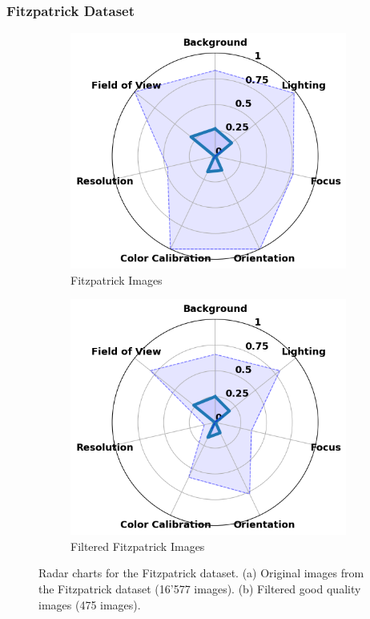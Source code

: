 \subsubsection{Fitzpatrick Dataset}
\label{subsubsec:FitzpatrickDataset}
\begin{figure}[ht]
    \centering
    \begin{subfigure}[b]{0.48\textwidth}
        \includegraphics[width=\textwidth]{img/hept/Fitzpatrick17k.png}
        \caption{Fitzpatrick Images}
        \label{fig:Fitzpatrick17K}
    \end{subfigure}
    \hfill
    \begin{subfigure}[b]{0.48\textwidth}
        \includegraphics[width=\textwidth]{img/hept/F17K.png}
        \caption{Filtered Fitzpatrick Images}
        \label{fig:F17K}
    \end{subfigure}
    \hfill
    \caption{Radar charts for the Fitzpatrick dataset. (a) Original images from the Fitzpatrick dataset (16'577 images). (b) Filtered good quality images (475 images).}
    \label{fig:FF}
\end{figure}

